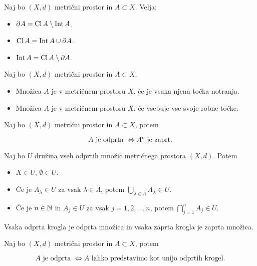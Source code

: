\begin{trditev}
    Naj bo $(X, d)$ metrični prostor in $A \subset X$. Velja:
    \begin{itemize}
        \item $\partial A = \operatorname{Cl} A \setminus \operatorname{Int} A$.
        \item $\operatorname{Cl} A = \operatorname{Int} A \cup \partial A$.
        \item $\operatorname{Int} A = \operatorname{Cl} A \setminus \partial A$.
    \end{itemize}
\end{trditev}

\begin{definicija}    
    Naj bo $(X, d)$ metrični prostor in $A \subset X$.
    \begin{itemize}
        \item Množica $A$ je  v metričnem prostoru $X$, če je vsaka njena točka notranja.
        \item Množica $A$ je  v metričnem prostoru $X$, če vsebuje vse svoje robne točke.
    \end{itemize}
\end{definicija}

\begin{trditev}
    Naj bo $(X, d)$ metrični prostor in $A \subset X$, potem 

    $$A \text{ je odprta } \Leftrightarrow A^c \text{ je zaprt}.$$
\end{trditev}

\begin{izrek}
    Naj bo $U$ družina vseh odprtih množic metričnega prostora $(X, d)$. Potem
    \begin{itemize}
        \item $X \in U$, $\emptyset \in U$.
        \item Če je $A_\lambda \in U$ za vsak $\lambda \in \Lambda$, potem $ \bigcup_{\lambda \in \Lambda} A_\lambda \in U$.
        \item Če je $n \in \mathbb{N}$ in $A_j \in U$ za vsak $j = 1, 2, \ldots, n$, potem $ \bigcap_{j=1}^n A_j \in U$.
    \end{itemize}
\end{izrek}

\begin{trditev}
    Vsaka odprta krogla je odprta množica in vsaka zaprta krogla je zaprta množica.
\end{trditev}

\begin{trditev}
    Naj bo $(X, d)$ metrični prostor in $A \subset X$, potem 

    $$A \text{ je odprta } \Leftrightarrow A \text{ lahko predstavimo kot unijo odprtih krogel}.$$
\end{trditev}

